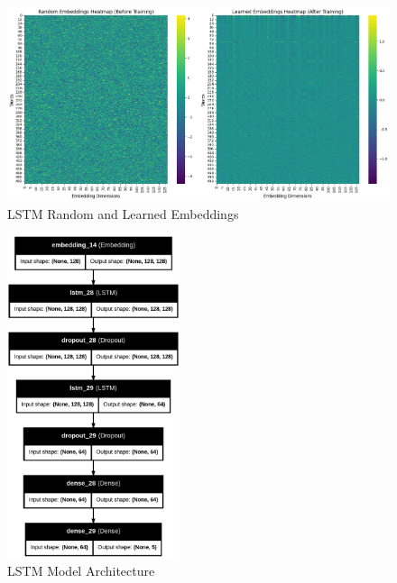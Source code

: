 \begin{figure}[h!]  
    \centering
    \includegraphics[width=1.0\textwidth]{Images/LSTM EMBED.png}  
    \caption{LSTM Random and Learned Embeddings}
    \label{lstm embed}  %
\end{figure}

\pagebreak

\begin{figure}[h!]  
    \centering
    \includegraphics[width=0.45\textwidth]{Images/LSTM MODEL.png}  
    \caption{LSTM Model Architecture}
    \label{lstm arch}  %
\end{figure}


